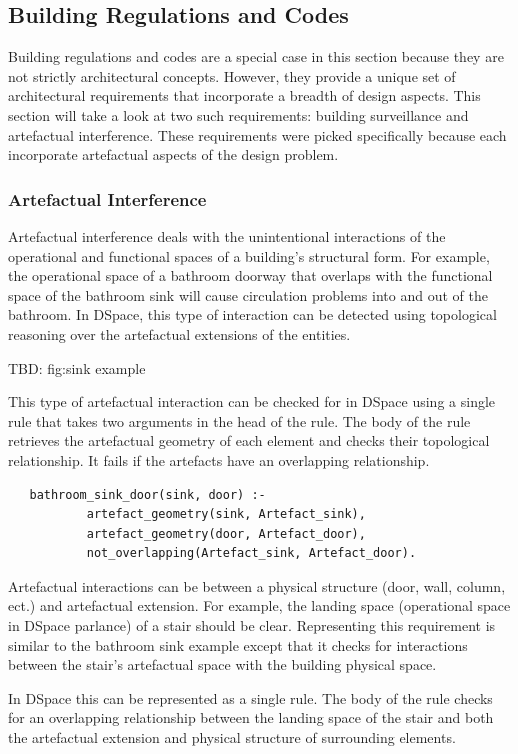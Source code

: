 \documentclass[12pt]{ucthesis}
\begin{document}
\subsection{Building Regulations and Codes}
Building regulations and codes are a special case in this section because they are not strictly architectural concepts. However, they provide a unique set of architectural requirements that incorporate a breadth of design aspects. This section will take a look at two such requirements: building surveillance and artefactual interference. These requirements were picked specifically because each incorporate artefactual aspects of the design problem. 

\subsubsection{Artefactual Interference}
Artefactual interference deals with the unintentional interactions of the operational and functional spaces of a building's structural form. For example, the operational space of a bathroom doorway that overlaps with the functional space of the bathroom sink will cause circulation problems into and out of the bathroom. In DSpace, this type of interaction can be detected using topological reasoning over the artefactual extensions of the entities. 

TBD: fig:sink example

This type of artefactual interaction can be checked for in DSpace using a single rule that takes two arguments in the head of the rule. The body of the rule retrieves the artefactual geometry of each element and checks their topological relationship. It fails if the artefacts have an overlapping relationship.

\begin{verbatim}
   bathroom_sink_door(sink, door) :- 
           artefact_geometry(sink, Artefact_sink),
           artefact_geometry(door, Artefact_door),
           not_overlapping(Artefact_sink, Artefact_door).
\end{verbatim}

Artefactual interactions can be between a physical structure (door, wall, column, ect.) and artefactual extension. For example, the landing space (operational space in DSpace parlance) of a stair should be clear. Representing this requirement is similar to the bathroom sink example except that it checks for interactions between the stair's artefactual space with the building physical space.

In DSpace this can be represented as a single rule. The body of the rule checks for an overlapping relationship between the landing space of the stair and both the artefactual extension and physical structure of surrounding elements.
\end{document}
